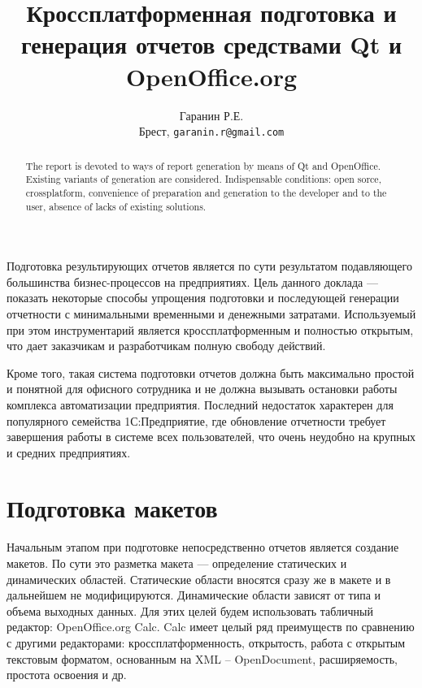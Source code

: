 \documentclass[10pt, a5paper]{article}
\begin{document}
\title{Кросcплатформенная подготовка и генерация отчетов средствами Qt и OpenOffice.org}
\author{Гаранин Р.Е.
\\
\small Брест, \texttt{garanin.r@gmail.com}
}
\maketitle

\begin{abstract}
The report is devoted to ways of report generation by means of Qt and OpenOffice. Existing
variants of generation are considered. Indispensable conditions: open
sorce, crossplatform,
convenience of preparation and generation to the developer and to the
user, absence of lacks of existing solutions.


\end{abstract}

Подготовка результирующих отчетов является по сути результатом подавляющего большинства бизнес-процессов на предприятиях. Цель данного доклада — показать некоторые способы упрощения подготовки и последующей генерации отчетности с минимальными временными и денежными затратами. Используемый при этом инструментарий является кроссплатформенным и полностью открытым, что дает заказчикам и разработчикам полную свободу действий.

Кроме того, такая система подготовки отчетов должна быть максимально простой и понятной для офисного сотрудника и не должна вызывать остановки работы комплекса автоматизации предприятия. Последний недостаток характерен для популярного семейства 1С:Предприятие, где обновление отчетности требует завершения работы в системе всех пользователей, что очень неудобно на крупных и средних предприятиях.

\section*{Подготовка макетов}
Начальным этапом при подготовке непосредственно отчетов является создание макетов. По сути это разметка макета — определение статических и динамических областей. Статические области вносятся сразу же в макете и в дальнейшем не модифицируются. Динамические области зависят от типа и объема выходных данных. Для этих целей будем использовать табличный редактор: OpenOffice.org Calc. Calc имеет целый ряд преимуществ по сравнению с другими редакторами: кроссплатформенность, открытость, работа с открытым текстовым форматом, основанным на XML – OpenDocument, расширяемость, простота освоения и др.
\end{document}
